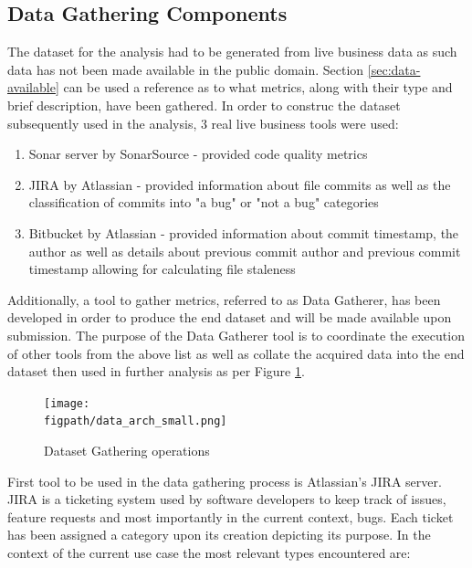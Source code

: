 \subsection{Data Gathering Components}
The dataset for the analysis had to be generated from live business data as such data has not been made available in the public domain. Section \ref{sec:data-available} can be used a reference as to what metrics, along with their type and brief description, have been gathered. In order to construc the dataset subsequently used in the analysis, 3 real live business tools were used:

\begin{enumerate}{\label{lst:tools_used}}
    \item Sonar server by SonarSource - provided code quality metrics
    \item JIRA by Atlassian  - provided information about file commits as well as the classification of commits into "a bug" or "not a bug" categories
    \item Bitbucket by Atlassian  - provided information about commit timestamp, the author as well as details about previous commit author and previous commit timestamp allowing for calculating file staleness 
\end{enumerate}
    
Additionally, a tool to gather metrics, referred to as Data Gatherer, has been developed in order to produce the end dataset and will be made available upon submission. The purpose of the Data Gatherer tool is to coordinate the execution of other tools from the above list as well as collate the acquired data into the end dataset then used in further analysis as per Figure \ref{fig:data_gathering}.

\begin{figure}[h!]
\centering
    \texttt{[image: \\figpath/data\_arch\_small.png]}
    \caption{Dataset Gathering operations}
    \label{fig:data_gathering}
\end{figure}

First tool to be used in the data gathering process is Atlassian's JIRA server. JIRA is a ticketing system used by software developers to keep track of issues, feature requests and most importantly in the current context, bugs. Each ticket has been assigned a category upon its creation depicting its purpose. In the context of the current use case the most relevant types encountered are:

